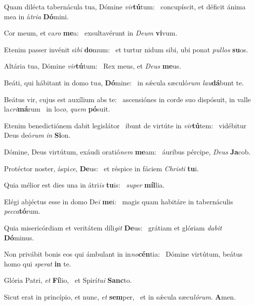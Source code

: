 \item Quam dilécta tabernácula tua, Dómine \textit{vir}\textbf{tú}tum:~\psstar{} concupíscit, et déficit ánima mea in á\textit{tria} \textbf{Dó}mini.

\item Cor meum, et ca\textit{ro} \textbf{me}a:~\psstar{} exsultavérunt in \textit{Deum} \textbf{vi}vum.

\item Etenim passer invénit si\textit{bi} \textbf{do}mum:~\psstar{} et turtur nidum sibi, ubi ponat \textit{pullos} \textbf{su}os.

\item Altária tua, Dómine \textit{vir}\textbf{tú}tum:~\psstar{} Rex meus, et \textit{Deus} \textbf{me}us.

\item Beáti, qui hábitant in domo tu\textit{a}, \textbf{Dó}mine:~\psstar{} in sǽcula sæculó\textit{rum} \textit{lau}\textbf{dá}bunt te.

\item Beátus vir, cujus est auxílium abs te:~\pscross{} ascensiónes in corde suo dispósuit, in valle la\textit{cri}\textbf{má}rum~\psstar{} in lo\textit{co}, \textit{quem} \textbf{pó}suit.

\item Etenim benedictiónem dabit legislátor~\pscross{} ibunt de virtúte in \textit{vir}\textbf{tú}tem:~\psstar{} vidébitur Deus deó\textit{rum} \textit{in} \textbf{Si}on.

\item Dómine, Deus virtútum, exáudi oratió\textit{nem} \textbf{me}am:~\psstar{} áuribus pércipe, \textit{Deus} \textbf{Ja}cob.

\item Protéctor noster, áspi\textit{ce}, \textbf{De}us:~\psstar{} et réspice in fáciem \textit{Christi} \textbf{tu}i.

\item Quia mélior est dies una in átri\textit{is} \textbf{tu}is:~\psstar{} \textit{super} \textbf{míl}lia.

\item Elégi abjéctus esse in domo De\textit{i} \textbf{me}i:~\psstar{} magis quam habitáre in tabernáculis \textit{pecca}\textbf{tó}rum.

\item Quia misericórdiam et veritátem díli\textit{git} \textbf{De}us:~\psstar{} grátiam et glóriam \textit{dabit} \textbf{Dó}minus.

\item Non privábit bonis eos qui ámbulant in in\textit{no}\textbf{cén}tia:~\psstar{} Dómine virtútum, beátus homo qui \textit{sperat} \textbf{in} te.

\item Glória Patri, \textit{et} \textbf{Fí}lio,~\psstar{} et Spirí\textit{tui} \textbf{Sanc}to.

\item Sicut erat in princípio, et nunc, \textit{et} \textbf{sem}per,~\psstar{} et in sǽcula sæcu\textit{lórum}. \textbf{A}men.